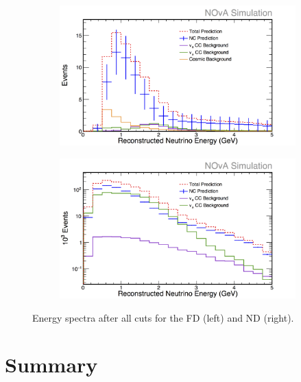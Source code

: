 \begin{figure}[h]
  \centering
  \begin{subfigure}{.48\textwidth}
    \centering
    \includegraphics[width=1\linewidth]{figures/RecoE6FD.png}
  \end{subfigure}
  \begin{subfigure}{.48\textwidth}
    \centering
    \includegraphics[width=1\linewidth]{figures/RecoE6ND.png}
  \end{subfigure}
  \caption[Energy Spectra After All Cuts]{Energy spectra after all cuts for the FD (left) and ND (right).}
  \label{fig:Sel}
\end{figure}

\section{Summary}

